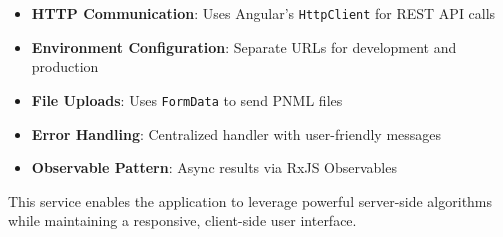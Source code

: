 \begin{itemize}
    \item \textbf{HTTP Communication}: Uses Angular's \texttt{HttpClient} for REST API calls
    \item \textbf{Environment Configuration}: Separate URLs for development and production
    \item \textbf{File Uploads}: Uses \texttt{FormData} to send PNML files
    \item \textbf{Error Handling}: Centralized handler with user-friendly messages
    \item \textbf{Observable Pattern}: Async results via RxJS Observables
\end{itemize}

This service enables the application to leverage powerful server-side algorithms while maintaining a responsive, client-side user interface.
